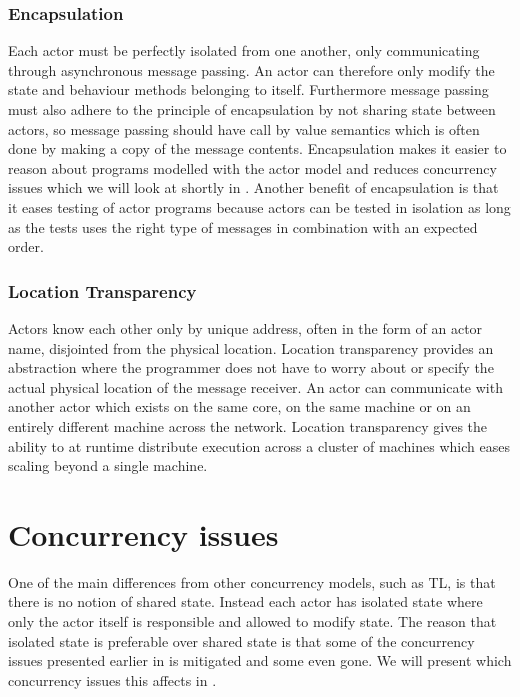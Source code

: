 \subsubsection{Encapsulation}
Each actor must be perfectly isolated from one another, only communicating through asynchronous message passing. An actor can therefore only modify the state and behaviour methods belonging to itself. Furthermore message passing must also adhere to the principle of encapsulation by not sharing state between actors, so message passing should have call by value semantics which is often done by making a copy of the message contents\cite[p. 2]{karmani2009actor}. Encapsulation makes it easier to reason about programs modelled with the actor model\cite[p. 3]{karmani2009actor} and reduces concurrency issues which we will look at shortly in . Another benefit of encapsulation is that it eases testing of actor programs because actors can be tested in isolation as long as the tests uses the right type of messages in combination with an expected order\cite[p. 151]{sevenModels}.

\subsubsection{Location Transparency}
Actors know each other only by unique address, often in the form of an actor name, disjointed from the physical location. Location transparency provides an abstraction where the programmer does not have to worry about or specify the actual physical location of the message receiver. An actor can communicate with another actor which exists on the same core, on the same machine or on an entirely different machine across the network\cite[p. 3]{karmani2009actor}. Location transparency gives the ability to at runtime distribute execution across a cluster of machines which eases scaling beyond a single machine.

\section{Concurrency issues}\label{sec:actor_con_issues}
One of the main differences from other concurrency models, such as \ac{TL}, is that there is no notion of shared state. Instead each actor has isolated state where only the actor itself is responsible and allowed to modify state. The reason that isolated state is preferable over shared state is that some of the concurrency issues presented earlier in  is mitigated and some even gone. We will present which concurrency issues this affects in .

